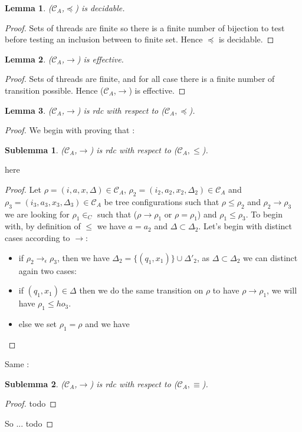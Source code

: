 \documentclass[a4paper,10pt]{report}
\newtheorem{lm}{Lemma}[thr]
\newtheorem{slm}{Sublemma}[lm]
\newcommand{\C}{\mathcal{C}_{A}}
\begin{document}
\begin{lm} \label{cd2}
  ($\C$,$\preceq$) is decidable.
\end{lm}
\begin{proof}
  Sets of threads are finite so there is a finite number of bijection to test before testing an inclusion between to finite set.
  Hence $\preceq$ is decidable.
\end{proof}

\begin{lm} \label{cd3}
  ($\C$,$\rightarrow$) is effective.
\end{lm}

\begin{proof}
   Sets of threads are finite, and for all case there is a finite number of transition possible.
   Hence   ($\C$,$\rightarrow$) is effective.
\end{proof}

\begin{lm} \label{cd4}
  ($\C$,$\rightarrow$) is rdc with respect to ($\C,\preceq$).
\end{lm}

\begin{proof}
  We begin with proving that :
  \begin{slm}
    ($\C$,$\rightarrow$) is rdc with respect to ($\C,\leq$).
  \end{slm}
  here
  \begin{proof}
   Let $\rho = (i,a,x,\Delta) \in \C$, $\rho_2 = (i_2,a_2,x_2,\Delta_2) \in \C$ and $\rho_3 = (i_3,a_3,x_3,\Delta_3) \in \C$ be tree configurations 
   such that $\rho \leq \rho_2$ and $\rho_2 \rightarrow \rho_3$ we are looking for $\rho_1 \in _C$ such that ($\rho \rightarrow \rho_1$ or $\rho = \rho_1$) and $\rho_1 \leq \rho_3$.
   To begin with, by definition of $\leq$ we have $a= a_2$ and $\Delta \subset \Delta_2$. Let's begin with distinct cases according to $\rightarrow$: 
   \begin{itemize}
    \item if $\rho_2 \rightarrow_{\epsilon} \rho_3$, then we have $\Delta_2 = \{(q_1,x_1) \} \cup \Delta'_2$, as $\Delta \subset \Delta_2$ we can distinct again two cases:
      \item if $(q_1,x_1) \in \Delta$ then we do the same transition on $\rho$ to have $\rho \rightarrow \rho_1$, we will have $\rho_1 \leq ho_3$.
      \item else we set $\rho_1 = \rho$ and we have
   \end{itemize}

   
  \end{proof}
  Same :
  \begin{slm}
    ($\C$,$\rightarrow$) is rdc with respect to ($\C,\equiv$).
  \end{slm}
  \begin{proof}
    todo
  \end{proof}
   So ... todo
  
  
\end{proof}
\end{document}
